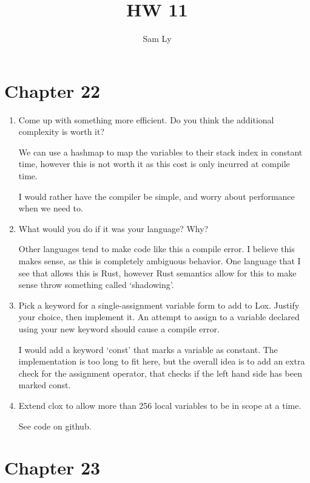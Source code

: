 \documentclass{article}
\title{HW 11}
\author{Sam Ly}
\begin{document}
\maketitle

\section*{Chapter 22}

\begin{enumerate}
    \item {
        Come up with something more efficient. Do you think the additional complexity is worth it?

        We can use a hashmap to map the variables to their stack index in constant 
        time, however this is not worth it as this cost is only incurred at 
        compile time.

        I would rather have the compiler be simple, and worry about performance 
        when we need to.
    }

    \item {
        What would you do if it was your language? Why?

        Other languages tend to make code like this a compile error. I believe this 
        makes sense, as this is completely ambiguous behavior. One language that 
        I see that allows this is Rust, however Rust semantics allow for this 
        to make sense throw something called `shadowing'.
    }

    \item {
        Pick a keyword for a single-assignment variable form to add to Lox. Justify your choice, then
        implement it. An attempt to assign to a variable declared using your new keyword should
        cause a compile error.

        I would add a keyword `const' that marks a variable as constant. 
        The implementation is too long to fit here, but the overall idea is to 
        add an extra check for the assignment operator, that checks if the 
        left hand side has been marked const.
    }

    \item {
        Extend clox to allow more than 256 local variables to be in scope at a time.

        See code on github.
    }
\end{enumerate}

\section*{Chapter 23}
\end{document}
